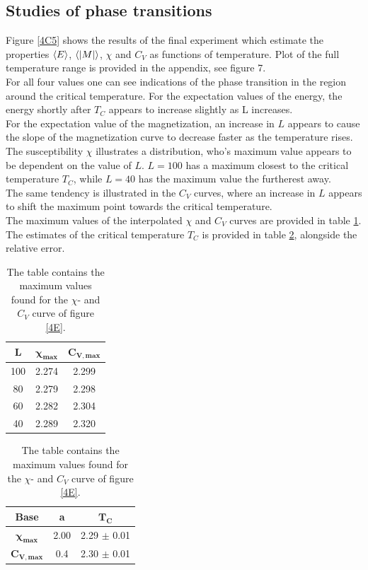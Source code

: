 \documentclass[%
reprint,nofootinbib,
amsmath,amssymb,
aps,
]{revtex4-1}
\begin{document}
\subsection*{Studies of phase transitions} \noindent
Figure \ref{4C5} shows the results of the final experiment which estimate the properties $\expval{E}$, $\expval{\abs{M}}$, $\chi$ and $C_V$ as functions of temperature. Plot of the full temperature range is provided in the appendix, see figure 7. \\ \indent 
For all four values one can see indications of the phase transition in the region around the critical temperature. For the expectation values of the energy, the energy shortly after $T_C$ appears to increase slightly as L increases. \\ \indent
For the expectation value of the magnetization, an increase in $L$ appears to cause the slope of the magnetization curve to decrease faster as the temperature rises. \\ \indent 
The susceptibility $\chi$ illustrates a distribution, who's maximum value appears to be dependent on the value of $L$. $L = 100$ has a maximum closest to the critical temperature $T_C$, while $L = 40$ has the maximum value the furtherest away. \\ \indent 
The same tendency is illustrated in the $C_V$ curves, where an increase in $L$ appears to shift the maximum point towards the critical temperature.  \\ \indent  \newpage 
The maximum values of the interpolated $\chi$ and $C_V$ curves are provided in table \ref{TCc}. The estimates of the critical temperature $T_C$ is provided in table \ref{TCf}, alongside the relative error.
\begin{table}[!h]
	\caption{\label{TCc} The table contains the maximum values found for the $\chi$- and $C_V$ curve of figure \ref{4E}. }
	\begin{tabular}{|c|c|c|} \hline 
		\textbf{L} & $\mathbf{\chi_{max}}$ & $\mathbf{C_{V, max}}$ \\ \hline 
		100 & 2.274 & 2.299\\
		80 & 2.279 & 2.298\\
		60 & 2.282 & 2.304\\
		40 & 2.289 & 2.320\\ \hline 
	\end{tabular}
\end{table}

\begin{table}[!h]
	\caption{\label{TCf} The table contains the maximum values found for the $\chi$- and $C_V$ curve of figure \ref{4E}. }
	\begin{tabular}{|c|c|c|} \hline 
		\textbf{Base} & \textbf{a} & $\mathbf{T_C}$\\ \hline 
		$\mathbf{\chi_{max}}$ & 2.00 & 2.29 $\pm$ 0.01\\
		$\mathbf{C_{V, max}}$   & 0.4 & 2.30 $\pm$ 0.01 \\ 
\hline 
	\end{tabular}
\end{table}
\newpage
\end{document}
